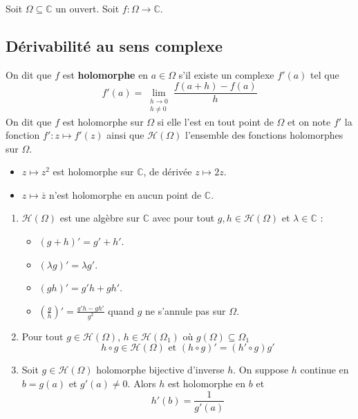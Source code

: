 



  Soit $\Omega \subseteq \mathbb{C}$ un ouvert. Soit $f : \Omega \rightarrow \mathbb{C}$.

  \subsection{Dérivabilité au sens complexe}


  \begin{definition}
    On dit que $f$ est \textbf{holomorphe} en $a \in \Omega$ s'il existe un complexe $f'(a)$ tel que
    \[ f'(a) = \lim_{\substack{h \rightarrow 0 \\ h \neq 0}} \frac{f(a+h) - f(a)}{h} \]
    On dit que $f$ est holomorphe sur $\Omega$ si elle l'est en tout point de $\Omega$ et on note $f'$ la fonction $f' : z \mapsto f'(z)$ ainsi que $\mathcal{H}(\Omega)$ l'ensemble des fonctions holomorphes sur $\Omega$.
  \end{definition}

  \begin{example}
    \begin{itemize}
      \item $z \mapsto z^2$ est holomorphe sur $\mathbb{C}$, de dérivée $z \mapsto 2z$.
      \item $z \mapsto \overline{z}$ n'est holomorphe en aucun point de $\mathbb{C}$.
    \end{itemize}
  \end{example}

  \begin{proposition}
    \begin{enumerate}[label=(\roman*)]
      \item $\mathcal{H}(\Omega)$ est une algèbre sur $\mathbb{C}$ avec pour tout $g, h \in \mathcal{H}(\Omega)$ et $\lambda \in \mathbb{C}$ :
      \begin{itemize}
        \item $(g+h)' = g'+h'$.
        \item $(\lambda g)' = \lambda g'$.
        \item $(gh)' = g'h + gh'$.
        \item $\left( \frac{g}{h} \right)' = \frac{g'h - gh'}{g^2}$ quand $g$ ne s'annule pas sur $\Omega$.
      \end{itemize}
      \item Pour tout $g \in \mathcal{H}(\Omega)$, $h \in \mathcal{H}(\Omega_1)$ où $g(\Omega) \subseteq \Omega_1$
      \[ h \circ g \in \mathcal{H}(\Omega) \text{ et } (h \circ g)' = (h' \circ g) g' \]
      \item Soit $g \in \mathcal{H}(\Omega)$ holomorphe bijective d'inverse $h$. On suppose $h$ continue en $b = g(a)$ et $g'(a) \neq 0$. Alors $h$ est holomorphe en $b$ et
      \[ h'(b) = \frac{1}{g'(a)} \]
    \end{enumerate}
  \end{proposition}


